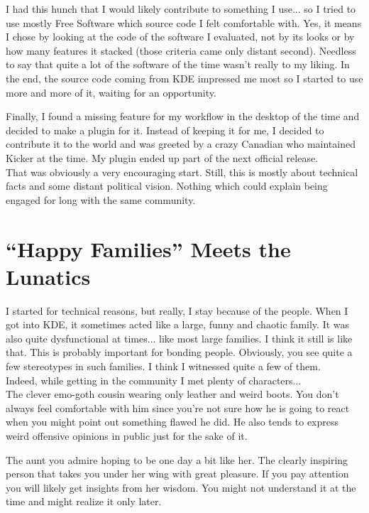 I had this hunch that I would likely contribute to something I use... so I
tried to use mostly Free Software which source code I felt comfortable with.
Yes, it means I chose by looking at the code of the software I evaluated, not
by its looks or by how many features it stacked (those criteria came only
distant second). Needless to say that quite a lot of the software of the time
wasn't really to my liking. In the end, the source code coming from KDE
impressed me most so I started to use more and more of it, waiting for an
opportunity.

Finally, I found a missing feature for my workflow in the desktop of the time
and decided to make a plugin for it. Instead of keeping it for me, I decided to
contribute it to the world and was greeted by a crazy Canadian who maintained
Kicker at the time. My plugin ended up part of the next official release. \\

That was obviously a very encouraging start. Still, this is mostly about
technical facts and some distant political vision. Nothing which could explain
being engaged for long with the same community.

\section*{``Happy Families'' Meets the Lunatics}
I started for technical reasons, but really, I stay because of the people.
When I got into KDE, it sometimes acted like a large, funny and chaotic family.
It was also quite dysfunctional at times... like most large families. I think it
still is like that. This is probably important for bonding people. Obviously,
you see quite a few stereotypes in such families. I think I witnessed quite a
few of them. \\

Indeed, while getting in the community I met plenty of characters... \\

The clever emo-goth cousin wearing only leather and weird boots. You don't
always feel comfortable with him since you're not sure how he is going to react
when you might point out something flawed he did. He also tends to express
weird offensive opinions in public just for the sake of it.

The aunt you admire hoping to be one day a bit like her. The clearly inspiring
person that takes you under her wing with great pleasure. If you pay attention
you will likely get insights from her wisdom. You might not understand it at
the time and might realize it only later.

